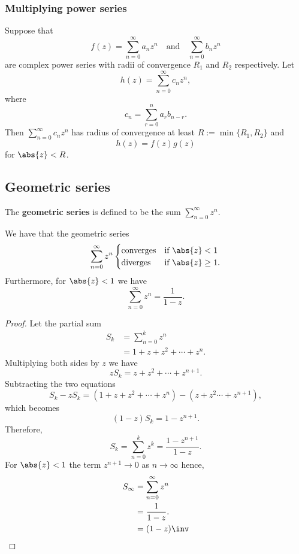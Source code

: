 \documentclass[12pt, a4paper]{article}
\begin{document}
\subsubsection{Multiplying power series}

\begin{theorem}
    Suppose that 
    \[f(z)=\sum_{n=0}^{\infty} a_n z^n \quad \text{and} \quad \sum_{n=0}^{\infty} b_n z^n\]
    are complex power series with radii of convergence \(R_1\) and \(R_2\) respectively. Let 
    \[h(z)=\sum_{n=0}^{\infty} c_n z^n,\]
    where 
    \[c_n = \sum_{r=0}^{n} a_r b_{n-r}.\]
    Then \(\sum_{n=0}^{\infty} c_n z^n\) has radius of convergence at least \(R:= \min\{R_1,R_2\}\) and 
    \[h(z)=f(z)g(z)\]
    for \(\abs{z}<R\).
\end{theorem}   

\subsection{Geometric series}

\begin{definition}
    The \textbf{geometric series} is defined to be the sum \(\sum_{n=0}^{\infty} z^n\).
\end{definition}

\begin{mdthm}
    We have that the geometric series 
    \[\begin{aligned}
        \sum_{n=0}^{\infty} z^n \begin{cases}
            \text{converges} &\text{if } \abs{z}<1 \\
            \text{diverges} &\text{if } \abs{z} \geq 1.
        \end{cases}
    \end{aligned}\]
    Furthermore, for \(\abs{z}<1\) we have
    \[\sum_{n=0}^{\infty} z^n = \frac{1}{1-z}.\]
\end{mdthm}

\begin{proof}
    Let the partial sum
    \[\begin{aligned}
        S_k &= \sum_{n=0}^{k} z^n \\
        &= 1+z+z^2+ \cdots + z^n.
    \end{aligned}\]
    Multiplying both sides by \(z\) we have 
    \[zS_k = z+z^2+ \cdots + z^{n+1}.\]
    Subtracting the two equations 
    \[S_k - zS_k = (1+z+z^2+\cdots +z^n) -(z+z^2 \cdots +z^{n+1}),\]
    which becomes 
    \[(1-z)S_k = 1-z^{n+1}.\]
    Therefore, 
    \[S_k = \sum_{n=0}^{k} z^k = \frac{1-z^{n+1}}{1-z}.\]
    For \(\abs{z}<1\) the term \(z^{n+1} \to 0\) as \(n \to \infty\) hence,
    \[\begin{aligned}
        S_\infty &= \sum_{n=0}^{\infty} z^n \\
        &= \frac{1}{1-z}. \\
        &= (1-z)\inv
    \end{aligned}\]
\end{proof}
\end{document}
